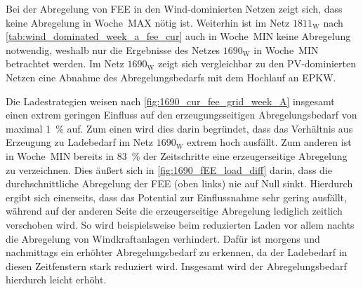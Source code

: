 

Bei der Abregelung von \gls{FEE} in den Wind-dominierten Netzen zeigt sich, dass keine Abregelung in Woche~MAX nötig ist.
Weiterhin ist im Netz \(1811_{\text{W}}\) nach \autoref{tab:wind_dominated_week_a_fee_cur} auch in Woche~MIN keine Abregelung notwendig, weshalb nur die Ergebnisse des Netzes \(1690_{\text{W}}\) in Woche~MIN betrachtet werden.
Im Netz \(1690_{\text{W}}\) zeigt sich vergleichbar zu den \gls{PV}-dominierten Netzen eine Abnahme des Abregelungsbedarfs mit dem Hochlauf an \gls{EPKW}.\medskip

Die Ladestrategien weisen nach \autoref{fig:1690_cur_fee_grid_week_A} insgesamt einen extrem geringen Einfluss auf den erzeugungsseitigen Abregelungsbedarf von maximal \SI{1}{\percent} auf.
Zum einen wird dies darin begründet, dass das Verhältnis aus Erzeugung zu Ladebedarf im Netz \(1690_{\text{W}}\) extrem hoch ausfällt.
Zum anderen ist in Woche~MIN bereits in \SI{83}{\percent} der Zeitschritte eine erzeugerseitige Abregelung zu verzeichnen.
Dies äußert sich in \autoref{fig:1690_fEE_load_diff} darin, dass die durchschnittliche Abregelung der \gls{FEE} (oben links) nie auf Null sinkt.
Hierdurch ergibt sich einerseits, dass das Potential zur Einflussnahme sehr gering ausfällt, während auf der anderen Seite die erzeugerseitige Abregelung lediglich zeitlich verschoben wird.
So wird beispielsweise beim reduzierten Laden vor allem nachts die Abregelung von Windkraftanlagen verhindert.
Dafür ist morgens und nachmittags ein erhöhter Abregelungsbedarf zu erkennen, da der Ladebedarf in diesen Zeitfenstern stark reduziert wird.
Insgesamt wird der Abregelungsbedarf hierdurch leicht erhöht.



